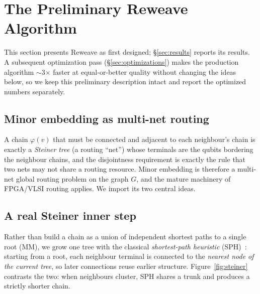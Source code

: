 \documentclass[acmsmall,anonymous,nonacm]{acmart}
\begin{document}
\section{The Preliminary Reweave Algorithm}
\label{sec:reweave}

This section presents Reweave as first designed; \S\ref{sec:results} reports
its results. A subsequent optimization pass (\S\ref{sec:optimizations}) makes the
production algorithm $\sim$3$\times$ faster at equal-or-better quality without
changing the ideas below, so we keep this preliminary description intact and
report the optimized numbers separately.

\subsection{Minor embedding as multi-net routing}
A chain $\varphi(v)$ that must be connected and adjacent to each neighbour's
chain is exactly a \emph{Steiner tree} (a routing ``net'') whose terminals are
the qubits bordering the neighbour chains, and the disjointness requirement is
exactly the rule that two nets may not share a routing resource. Minor embedding
is therefore a multi-net global routing problem on the graph $G$, and the
mature machinery of FPGA/VLSI routing applies. We import its two central ideas.

\subsection{A real Steiner inner step}
\label{sec:steiner}
Rather than build a chain as a union of independent shortest paths to a single
root (MM), we grow one tree with the classical \emph{shortest-path heuristic}
(SPH)~\cite{takahashi1980sph,mehlhorn1988steiner}: starting from a root, each
neighbour terminal is connected to the \emph{nearest node of the current tree},
so later connections reuse earlier structure. Figure~\ref{fig:steiner}
contrasts the two: when neighbours cluster, SPH shares a trunk and produces a
strictly shorter chain.
\end{document}
